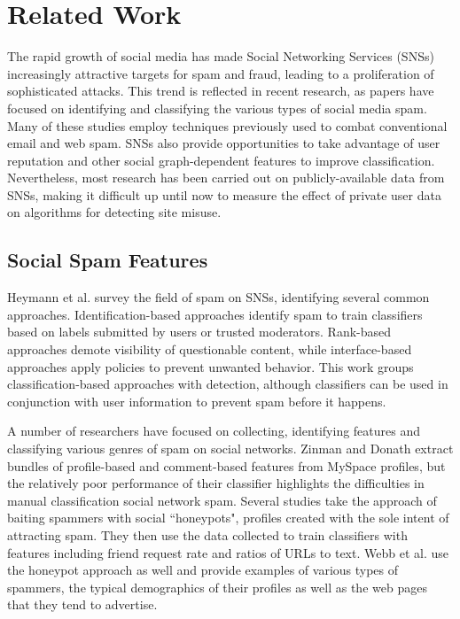\documentclass[preprint]{acm_proc_article-sp}
\begin{document}
\section{Related Work} 

The rapid growth of social media has made Social Networking Services (SNSs) 
increasingly attractive targets for spam and fraud, leading to a proliferation 
of sophisticated attacks. This trend is reflected in recent research, as papers 
have focused on identifying and classifying the various types of social media spam. 
Many of these studies employ techniques previously used to combat conventional 
email and web spam. SNSs also provide opportunities to take advantage of user 
reputation and other social graph-dependent features to improve classification. 
Nevertheless, most research has been carried out on publicly-available data 
from SNSs, making it difficult up until now to measure the effect of private user 
data on algorithms for detecting site misuse.


\subsection{Social Spam Features}

Heymann et al. \cite{heymann} survey the field of spam on SNSs, identifying 
several common approaches. Identification-based approaches identify spam to 
train classifiers based on labels submitted by users or trusted moderators. 
Rank-based approaches demote visibility of questionable content, while interface-based 
approaches apply policies to prevent unwanted behavior. This work groups 
classification-based approaches with detection, although classifiers can be 
used in conjunction with user information to prevent spam before it happens.

A number of researchers have focused on collecting, identifying features 
and classifying various genres of spam on social networks. Zinman and 
Donath \cite{zinman} extract bundles of profile-based and comment-based 
features from MySpace profiles, but the relatively poor performance of their classifier highlights 
the difficulties in manual classification social network spam. Several 
studies take the approach of baiting spammers with social ``honeypots", profiles 
created with the sole intent of attracting spam.\cite{stringhini, lee} They 
then use the data collected to train classifiers with features including 
friend request rate and ratios of URLs to text. Webb et al. \cite{webb} use 
the honeypot approach as well and provide examples of various types of spammers, 
the typical demographics of their profiles as well as the web pages that they tend to advertise. 
\end{document}
